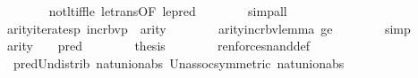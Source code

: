 \begin{isabellebody}
\ \ \ \ \ \ \isamarkupfalse%
\ not{\isacharunderscore}{\kern0pt}lt{\isacharunderscore}{\kern0pt}iff{\isacharunderscore}{\kern0pt}le\ le{\isacharunderscore}{\kern0pt}trans{\isacharbrackleft}{\kern0pt}OF\ le{\isacharunderscore}{\kern0pt}pred{\isacharbrackright}{\kern0pt}\isanewline
\ \ \ \ \ \ \isamarkupfalse%
\ simp{\isacharunderscore}{\kern0pt}all\isanewline
\ \ \ \ \isamarkupfalse%
\ {\isacartoucheopen}{\isasymphi}{\isasymin}{\isacharunderscore}{\kern0pt}{\isacartoucheclose}\isanewline
\ \ \ \ \isamarkupfalse%
\ {\isachardoublequoteopen}arity{\isacharparenleft}{\kern0pt}iterates{\isacharparenleft}{\kern0pt}{\isasymlambda}p{\isachardot}{\kern0pt}\ incr{\isacharunderscore}{\kern0pt}bv{\isacharparenleft}{\kern0pt}p{\isacharparenright}{\kern0pt}{\isacharbackquote}{\kern0pt}{}{\isacharcomma}{\kern0pt}{}{\isacharcomma}{\kern0pt}{\isasymphi}{\isacharparenright}{\kern0pt}{\isacharparenright}{\kern0pt}\ {\isacharequal}{\kern0pt}\ {\isacharparenleft}{\kern0pt}arity{\isacharparenleft}{\kern0pt}{\isasymphi}{\isacharparenright}{\kern0pt}{\isacharparenright}{\kern0pt}{\isachardoublequoteclose}\isanewline
\ \ \ \ \ \ \isamarkupfalse%
\ arity{\isacharunderscore}{\kern0pt}incr{\isacharunderscore}{\kern0pt}bv{\isacharunderscore}{\kern0pt}lemma\ ge\isanewline
\ \ \ \ \ \ \isamarkupfalse%
\ simp\isanewline
\ \ \ \ \isamarkupfalse%
\ {\isacartoucheopen}arity{\isacharparenleft}{\kern0pt}{\isasymphi}{\isacharparenright}{\kern0pt}\ {\isasymle}\ {}{\isacartoucheclose}\ {\isacartoucheopen}{\isasymphi}{\isasymin}{\isacharunderscore}{\kern0pt}{\isacartoucheclose}\ {\isacartoucheopen}pred{\isacharparenleft}{\kern0pt}{\isacharunderscore}{\kern0pt}{\isacharparenright}{\kern0pt}\ {\isasymle}\ {}{\isacartoucheclose}\isanewline
\ \ \ \ \isamarkupfalse%
\ {\isacharquery}{\kern0pt}thesis\isanewline
\ \ \ \ \ \ \isamarkupfalse%
\ ren{\isacharunderscore}{\kern0pt}forces{\isacharunderscore}{\kern0pt}nand{\isacharunderscore}{\kern0pt}def\isanewline
\ \ \ \ \ \ \isamarkupfalse%
\ \ pred{\isacharunderscore}{\kern0pt}Un{\isacharunderscore}{\kern0pt}distrib\ nat{\isacharunderscore}{\kern0pt}union{\isacharunderscore}{\kern0pt}abs{}\ Un{\isacharunderscore}{\kern0pt}assoc{\isacharbrackleft}{\kern0pt}symmetric{\isacharbrackright}{\kern0pt}\ nat{\isacharunderscore}{\kern0pt}union{\isacharunderscore}{\kern0pt}abs{}\isanewline
\ \ \ \ \ \ \isamarkupfalse%

\end{isabellebody}
